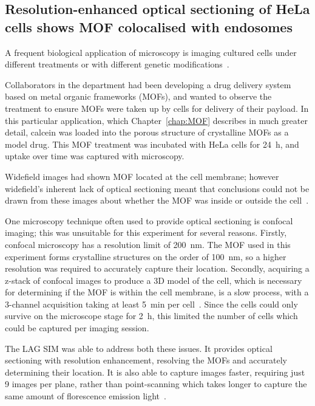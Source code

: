 \subsection{Resolution-enhanced optical sectioning of HeLa cells shows MOF colocalised with endosomes} \label{sec:showcase-MOF}
A frequent biological application of microscopy is imaging cultured cells under different treatments or with different genetic modifications~\cite{white1987evaluation, specht2017critical, wang2017analysis}.

Collaborators in the department had been developing a drug delivery system based on metal organic frameworks (MOFs), and wanted to observe the treatment to ensure MOFs were taken up by cells for delivery of their payload.
In this particular application, which Chapter~\ref{chap:MOF} describes in much greater detail, calcein was loaded into the porous structure of crystalline MOFs as a model drug.
This MOF treatment was incubated with HeLa cells for \SI{24}{\hour}, and uptake over time was captured with microscopy.

Widefield images had shown MOF located at the cell membrane; however widefield's inherent lack of optical sectioning meant that conclusions could not be drawn from these images about whether the MOF was inside or outside the cell~\cite{orellana2015amorphous}.

One microscopy technique often used to provide optical sectioning is confocal imaging; this was unsuitable for this experiment for several reasons.
Firstly, confocal microscopy has a resolution limit of \SI{200}{\nano\metre}.
The MOF used in this experiment forms crystalline structures on the order of \SI{100}{\nano\metre}, so a higher resolution was required to accurately capture their location.
Secondly, acquiring a z-stack of confocal images to produce a 3D model of the cell, which is necessary for determining if the MOF is within the cell membrane, is a slow process, with a 3-channel acquisition taking at least \SI{5}{\minute} per cell~\cite{jonkman2015any}.
Since the cells could only survive on the microscope stage for \SI{2}{\hour}, this limited the number of cells which could be captured per imaging session.

The LAG SIM was able to address both these issues.
It provides optical sectioning with resolution enhancement, resolving the MOFs and accurately determining their location.
It is also able to capture images faster, requiring just 9 images per plane, rather than point-scanning which takes longer to capture the same amount of florescence emission light~\cite{jonkman2015any}.

